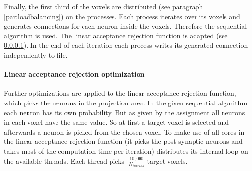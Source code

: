 Finally, the first third of the voxels are distributed (see paragraph \ref{par:loadbalancing}) on the processes.
Each process iterates over its voxels and generates connections for each neuron inside the voxels.
Therefore the sequential algorithm is used. The linear acceptance rejection function is adapted (see \ref{par:linearacceptancerejection}).
In the end of each iteration each process writes its generated connection independently to file.

\paragraph{Linear acceptance rejection optimization}
\label{par:linearacceptancerejection}
Further optimizations are applied to the linear acceptance rejection function,
which picks the neurons in the projection area.
In the given sequential algorithm each neuron has its own probability.
But as given by the assignment all neurons in each voxel have the same value.
So at first a target voxel is selected and afterwards a neuron is picked from the chosen voxel.
To make use of all cores in the linear acceptance rejection function
(it picks the post-synaptic neurons and takes most of the computation time per iteration)
distributes its internal loop on the available threads.
Each thread picks $~ \frac{10,000}{N_{threads}}$ target voxels.


